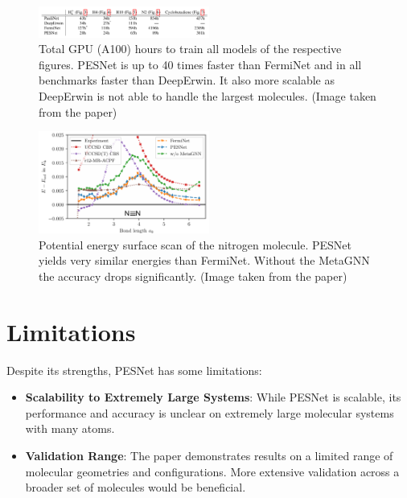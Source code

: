 \documentclass{article}
\begin{document}
\begin{figure}[h]
    \centering
    \includegraphics[width=0.5\textwidth]{table_gpu_times.png}
    \caption{Total GPU (A100) hours to train all models of the respective figures. PESNet is up to 40 times faster than FermiNet and in all benchmarks faster than DeepErwin. It also more scalable as DeepErwin is not able to handle the largest molecules. (Image taken from the paper)}
    \label{fig:gpu_times}
\end{figure}

\begin{figure}[h]
    \centering
    \includegraphics[width=0.5\textwidth]{FermiNet_PesNet_comparison}
    \caption{Potential energy surface scan of the
        nitrogen molecule. PESNet yields very similar energies than FermiNet. Without the MetaGNN the accuracy drops significantly. (Image taken from the paper)}
    \label{fig:comparison}
\end{figure}

\section{Limitations}
Despite its strengths, PESNet has some limitations:
\begin{itemize}
    \item \textbf{Scalability to Extremely Large Systems}: While PESNet is scalable, its performance and accuracy is unclear on extremely large molecular systems with many atoms.
    \item \textbf{Validation Range}: The paper demonstrates results on a limited range of molecular geometries and configurations. More extensive validation across a broader set of molecules would be beneficial.
\end{itemize}
\end{document}
